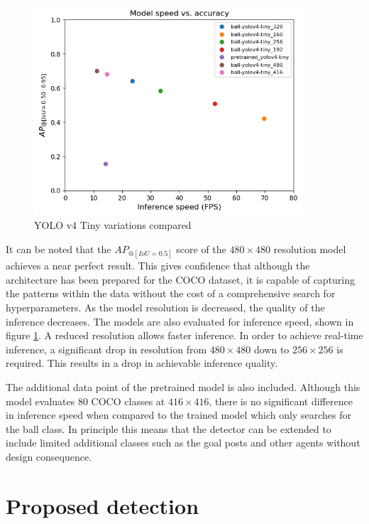 \documentclass[a4paper,twoside,12pt]{report}
\begin{document}
\begin{figure}[h!]
\begin{center}
\includegraphics[width=10cm]{images/yolov4tiny_compare.png}
\caption{YOLO v4 Tiny variations compared}
\label{fig:yolov4tiny_compare}
\end{center}
\end{figure}

It can be noted that the $AP_{@[IoU=0.5]}$ score of the $480 \times 480$ resolution model achieves a near perfect result. This gives confidence that although the architecture has been prepared for the COCO dataset, it is capable of capturing the patterns within the data without the cost of a comprehensive search for hyperparameters. As the model resolution is decreased, the quality of the inference decreases. The models are also evaluated for inference speed, shown in figure \ref{fig:yolov4tiny_compare}. A reduced resolution allows faster inference. In order to achieve real-time inference, a significant drop in resolution from $480 \times 480$ down to $256 \times 256$ is required. This results in a drop in achievable inference quality.

The additional data point of the pretrained model is also included. Although this model evaluates 80 COCO classes at $416 \times 416$, there is no significant difference in inference speed when compared to the trained model which only searches for the ball class. In principle this means that the detector can be extended to include limited additional classes such as the goal posts and other agents without design consequence.

\section{Proposed detection}
\end{document}
